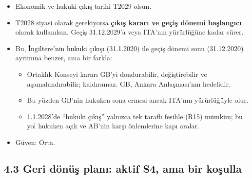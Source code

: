 \begin{itemize}
\tightlist
\item
  Ekonomik ve hukuki çıkış tarihi T2029 olsun.
\item
  T2028 siyasi olarak gerekiyorsa \textbf{çıkış kararı ve geçiş dönemi başlangıcı} olarak kullanılsın. Geçiş 31.12.2029'a veya ITA'nın yürürlüğüne kadar sürer.
\item
  Bu, İngiltere'nin hukuki çıkışı (31.1.2020) ile geçiş dönemi sonu (31.12.2020) ayrımına benzer, ama bir farkla:

  \begin{itemize}
  \tightlist
  \item
    Ortaklık Konseyi kararı GB'yi dondurabilir, değiştirebilir ve aşamalandırabilir; kaldıramaz. GB, Ankara Anlaşması'nın hedefidir.
  \item
    Bu yüzden GB'nin hukuken sona ermesi ancak ITA'nın yürürlüğüyle olur.
  \item
    1.1.2028'de ``hukuki çıkış'' yalnızca tek taraflı fesihle (R15) mümkün; bu yol hukuken açık ve AB'nin karşı önlemlerine kapı aralar.
  \end{itemize}
\item
  Güven: Orta.
\end{itemize}

\hypertarget{02b_secenekler_hukuk-43-geri-duxf6nuxfcux15f-planux131-aktif-s4-ama-bir-koux15fulla}{%
\subsection{4.3 Geri dönüş planı: aktif S4, ama bir koşulla}\label{02b_secenekler_hukuk-43-geri-duxf6nuxfcux15f-planux131-aktif-s4-ama-bir-koux15fulla}}

